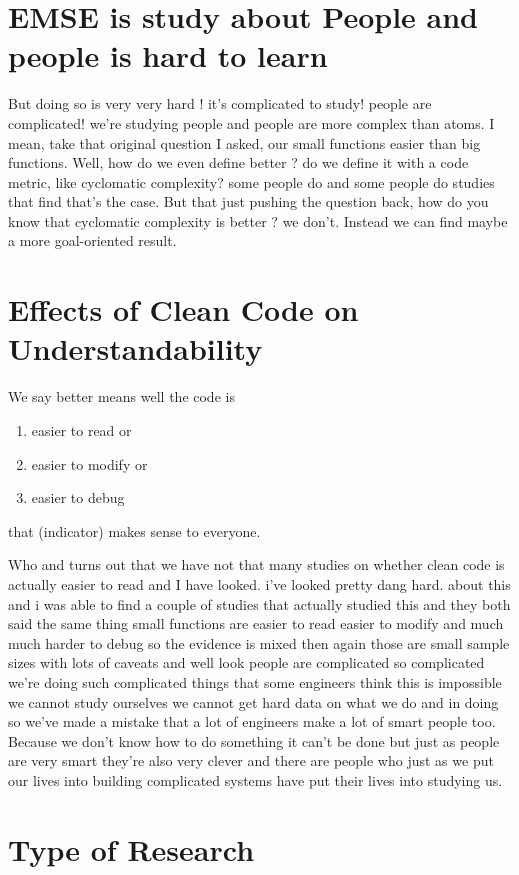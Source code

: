 \documentclass[14pt]{extreport}
\begin{document}
\chapter{EMSE is study about People and people is hard to learn}
But doing so is very very hard ! 
it's complicated to study! people are complicated! 
we're studying people and people are more complex than atoms.
I mean, take that original question I asked, our small functions easier than big functions.
Well, how do we even define better ? do we define it with a code metric, like cyclomatic complexity? 
some people do and some people do studies that find that's the case. 
But that just pushing the question back, 
how do you know that cyclomatic complexity is better ? 
we don't. Instead we can find maybe a more goal-oriented result. 

\chapter{Effects of Clean Code on Understandability}
We say better means well the code is 
\begin{enumerate}
	\item easier to read or
	\item easier to modify or
	\item easier to debug

\end{enumerate}
that (indicator) makes sense to everyone.

Who and turns out that we have not that many studies on whether clean code is actually easier to read and I have looked. i've looked pretty dang hard.
about this and i was able to find a
couple of studies that actually studied
this and they both said the same thing
small functions are easier to read
easier to modify and much much harder to
debug so the evidence is mixed then
again those are small sample sizes with lots of caveats and well look people are
complicated so complicated we're doing
such complicated things that some
engineers think this is impossible we
cannot study ourselves we cannot get
hard data on what we do and in doing so we've made a mistake that a lot of engineers make a lot of smart people too.
Because we don't know how to do something it can't be done but just as people are very smart they're also very
clever and there are people who just as we put our lives into building
complicated systems have put their lives into studying us.
\chapter{Type of Research} %
\label{sec:type_of_research}
\end{document}

